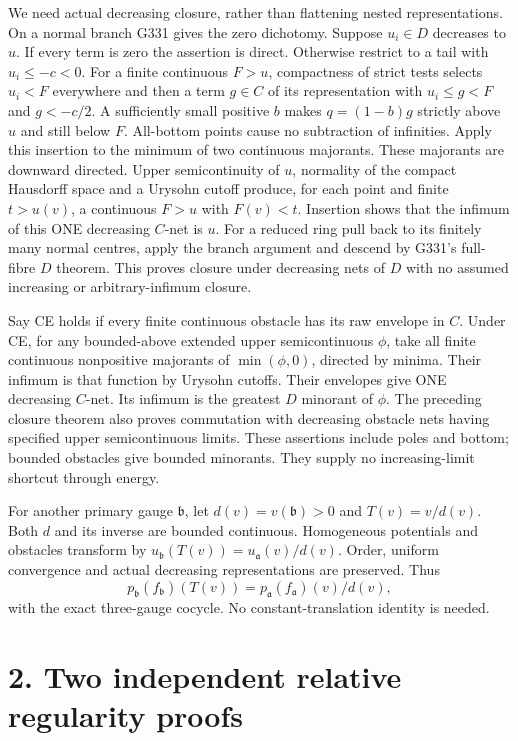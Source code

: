 \documentclass[11pt]{article}
\begin{document}
We need actual decreasing closure, rather than flattening nested representations. On a normal branch G331 gives the zero dichotomy. Suppose \(u_i\in D\) decreases to \(u\). If every term is zero the assertion is direct. Otherwise restrict to a tail with \(u_i\le-c<0\). For a finite continuous \(F>u\), compactness of strict tests selects \(u_i<F\) everywhere and then a term \(g\in C\) of its representation with \(u_i\le g<F\) and \(g<-c/2\). A sufficiently small positive \(b\) makes \(q=(1-b)g\) strictly above \(u\) and still below \(F\). All-bottom points cause no subtraction of infinities. Apply this insertion to the minimum of two continuous majorants. These majorants are downward directed. Upper semicontinuity of \(u\), normality of the compact Hausdorff space and a Urysohn cutoff produce, for each point and finite \(t>u(v)\), a continuous \(F>u\) with \(F(v)<t\). Insertion shows that the infimum of this ONE decreasing \(C\)-net is \(u\). For a reduced ring pull back to its finitely many normal centres, apply the branch argument and descend by G331's full-fibre \(D\) theorem. This proves closure under decreasing nets of \(D\) with no assumed increasing or arbitrary-infimum closure.

Say CE holds if every finite continuous obstacle has its raw envelope in \(C\). Under CE, for any bounded-above extended upper semicontinuous \(\phi\), take all finite continuous nonpositive majorants of \(\min(\phi,0)\), directed by minima. Their infimum is that function by Urysohn cutoffs. Their envelopes give ONE decreasing \(C\)-net. Its infimum is the greatest \(D\) minorant of \(\phi\). The preceding closure theorem also proves commutation with decreasing obstacle nets having specified upper semicontinuous limits. These assertions include poles and bottom; bounded obstacles give bounded minorants. They supply no increasing-limit shortcut through energy.

For another primary gauge \(\mathfrak b\), let \(d(v)=v(\mathfrak b)>0\) and \(T(v)=v/d(v)\). Both \(d\) and its inverse are bounded continuous. Homogeneous potentials and obstacles transform by \(u_{\mathfrak b}(T(v))=u_{\mathfrak a}(v)/d(v)\). Order, uniform convergence and actual decreasing representations are preserved. Thus
\[
p_{\mathfrak b}(f_{\mathfrak b})(T(v))=p_{\mathfrak a}(f_{\mathfrak a})(v)/d(v),
\]
with the exact three-gauge cocycle. No constant-translation identity is needed.

\section{2. Two independent relative regularity proofs}
\end{document}
